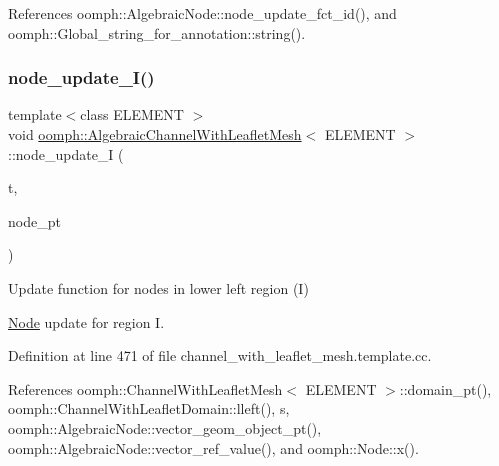References oomph\+::\+Algebraic\+Node\+::node\+\_\+update\+\_\+fct\+\_\+id(), and oomph\+::\+Global\+\_\+string\+\_\+for\+\_\+annotation\+::string().

\mbox{\label{classoomph_1_1AlgebraicChannelWithLeafletMesh_a53de0d31556bc78e22b5c06bb66bdd73}} 
\subsubsection{\texorpdfstring{node\+\_\+update\+\_\+\+I()}{node\_update\_I()}}
{\footnotesize\ttfamily template$<$class E\+L\+E\+M\+E\+NT $>$ \\
void \hyperlink{classoomph_1_1AlgebraicChannelWithLeafletMesh}{oomph\+::\+Algebraic\+Channel\+With\+Leaflet\+Mesh}$<$ E\+L\+E\+M\+E\+NT $>$\+::node\+\_\+update\+\_\+I (\begin{DoxyParamCaption}\item[{const unsigned \&}]{t,  }\item[{\hyperlink{classoomph_1_1AlgebraicNode}{Algebraic\+Node} $\ast$\&}]{node\+\_\+pt }\end{DoxyParamCaption})\hspace{0.3cm}{\ttfamily [protected]}}



Update function for nodes in lower left region (I) 

\hyperlink{classoomph_1_1Node}{Node} update for region I. 

Definition at line 471 of file channel\+\_\+with\+\_\+leaflet\+\_\+mesh.\+template.\+cc.



References oomph\+::\+Channel\+With\+Leaflet\+Mesh$<$ E\+L\+E\+M\+E\+N\+T $>$\+::domain\+\_\+pt(), oomph\+::\+Channel\+With\+Leaflet\+Domain\+::lleft(), s, oomph\+::\+Algebraic\+Node\+::vector\+\_\+geom\+\_\+object\+\_\+pt(), oomph\+::\+Algebraic\+Node\+::vector\+\_\+ref\+\_\+value(), and oomph\+::\+Node\+::x().

\mbox{\label{classoomph_1_1AlgebraicChannelWithLeafletMesh_aafaeee96d0e7602cc990229abbd9c8fd}} 
